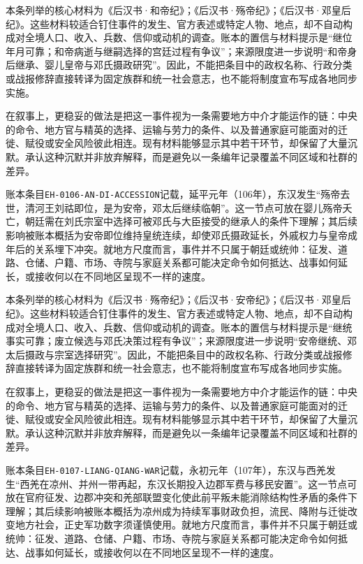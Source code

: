 本条列举的核心材料为《后汉书·和帝纪》；《后汉书·殇帝纪》；《后汉书·邓皇后纪》。这些材料较适合钉住事件的发生、官方表述或特定人物、地点，却不自动构成对全境人口、收入、兵数、信仰或动机的调查。账本的置信与材料提示是“继位年月可靠；和帝病逝与继嗣选择的宫廷过程有争议”；来源限度进一步说明“和帝身后继承、婴儿皇帝与邓氏摄政研究”。因此，不能把条目中的政权名称、行政分类或战报修辞直接转译为固定族群和统一社会意志，也不能将制度宣布写成各地同步实施。

在叙事上，更稳妥的做法是把这一事件视为一条需要地方中介才能运作的链：中央的命令、地方官与精英的选择、运输与劳力的条件、以及普通家庭可能面对的迁徙、赋役或安全风险彼此相连。现有材料能够显示其中若干环节，却保留了大量沉默。承认这种沉默并非放弃解释，而是避免以一条编年记录覆盖不同区域和社群的差异。

账本条目\texttt{EH-0106-AN-DI-ACCESSION}记载，延平元年（106年），东汉发生“殇帝去世，清河王刘祜即位，是为安帝，邓太后继续临朝”。这一节点可放在婴儿殇帝夭亡，朝廷需在刘氏宗室中选择可被邓氏与大臣接受的继承人的条件下理解；其后续影响被账本概括为安帝即位维持皇统连续，却使邓氏摄政延长，外戚权力与皇帝成年后的关系埋下冲突。就地方尺度而言，事件并不只属于朝廷或统帅：征发、道路、仓储、户籍、市场、寺院与家庭关系都可能决定命令如何抵达、战事如何延长，或接收何以在不同地区呈现不一样的速度。

本条列举的核心材料为《后汉书·殇帝纪》；《后汉书·安帝纪》；《后汉书·邓皇后纪》。这些材料较适合钉住事件的发生、官方表述或特定人物、地点，却不自动构成对全境人口、收入、兵数、信仰或动机的调查。账本的置信与材料提示是“继统事实可靠；废立候选与邓氏决策过程有争议”；来源限度进一步说明“安帝继统、邓太后摄政与宗室选择研究”。因此，不能把条目中的政权名称、行政分类或战报修辞直接转译为固定族群和统一社会意志，也不能将制度宣布写成各地同步实施。

在叙事上，更稳妥的做法是把这一事件视为一条需要地方中介才能运作的链：中央的命令、地方官与精英的选择、运输与劳力的条件、以及普通家庭可能面对的迁徙、赋役或安全风险彼此相连。现有材料能够显示其中若干环节，却保留了大量沉默。承认这种沉默并非放弃解释，而是避免以一条编年记录覆盖不同区域和社群的差异。

账本条目\texttt{EH-0107-LIANG-QIANG-WAR}记载，永初元年（107年），东汉与西羌发生“西羌在凉州、并州一带再起，东汉长期投入边郡军费与移民安置”。这一节点可放在官府征发、边郡冲突和羌部联盟变化使此前平叛未能消除结构性矛盾的条件下理解；其后续影响被账本概括为凉州成为持续军事财政负担，流民、降附与迁徙改变地方社会，正史军功数字须谨慎使用。就地方尺度而言，事件并不只属于朝廷或统帅：征发、道路、仓储、户籍、市场、寺院与家庭关系都可能决定命令如何抵达、战事如何延长，或接收何以在不同地区呈现不一样的速度。

